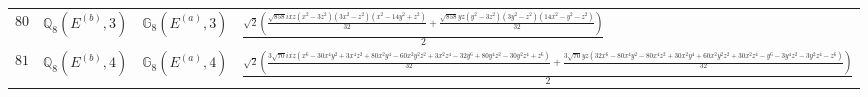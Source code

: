 \documentclass[fleqn,8pt,landscape]{jsarticle}
\begin{document}
\begin{table}[ht!]
\begin{center}
\begin{tabular}{cccl}
$ 80 $ & $ \mathbb{Q}_{8}(E^{(b)},3) $ & $ \mathbb{G}_{8}(E^{(a)},3) $ & $ \frac{\sqrt{2} \left(\frac{\sqrt{858} i x z \left(x^{2} - 3 z^{2}\right) \left(3 x^{2} - z^{2}\right) \left(x^{2} - 14 y^{2} + z^{2}\right)}{32} + \frac{\sqrt{858} y z \left(y^{2} - 3 z^{2}\right) \left(3 y^{2} - z^{2}\right) \left(14 x^{2} - y^{2} - z^{2}\right)}{32}\right)}{2} $ \\
$ 81 $ & $ \mathbb{Q}_{8}(E^{(b)},4) $ & $ \mathbb{G}_{8}(E^{(a)},4) $ & $ \frac{\sqrt{2} \left(\frac{3 \sqrt{70} i x z \left(x^{6} - 30 x^{4} y^{2} + 3 x^{4} z^{2} + 80 x^{2} y^{4} - 60 x^{2} y^{2} z^{2} + 3 x^{2} z^{4} - 32 y^{6} + 80 y^{4} z^{2} - 30 y^{2} z^{4} + z^{6}\right)}{32} + \frac{3 \sqrt{70} y z \left(32 x^{6} - 80 x^{4} y^{2} - 80 x^{4} z^{2} + 30 x^{2} y^{4} + 60 x^{2} y^{2} z^{2} + 30 x^{2} z^{4} - y^{6} - 3 y^{4} z^{2} - 3 y^{2} z^{4} - z^{6}\right)}{32}\right)}{2} $ \\
 \hline \hline
\end{tabular}
\end{center}
\end{table}
\end{document}
